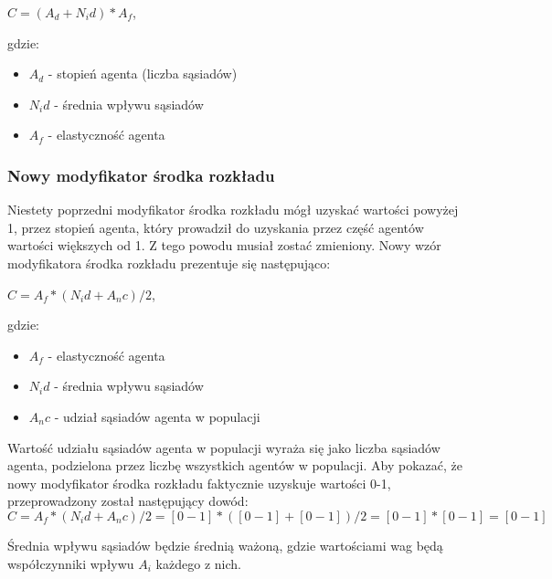 $ C = (A_d + N_id) * A_f $,

gdzie:
\begin{itemize}
    \item $A_d$ - stopień agenta (liczba sąsiadów)
    \item $N_id$ - średnia wpływu sąsiadów
    \item $A_f$ - elastyczność agenta
\end{itemize}

\subsubsection{Nowy modyfikator środka rozkładu}
Niestety poprzedni modyfikator środka rozkładu mógł uzyskać wartości powyżej 1, przez stopień agenta, który prowadził do uzyskania przez część agentów wartości większych od 1.
Z tego powodu musiał zostać zmieniony. Nowy wzór modyfikatora środka rozkładu prezentuje się następująco:

$ C = A_f * (N_id + A_nc) / 2 $,

gdzie:
\begin{itemize}
    \item $A_f$ - elastyczność agenta
    \item $N_id$ - średnia wpływu sąsiadów
    \item $A_nc$ - udział sąsiadów agenta w populacji
\end{itemize}

Wartość udziału sąsiadów agenta w populacji wyraża się jako liczba sąsiadów agenta, podzielona przez liczbę wszystkich agentów w populacji.
Aby pokazać, że nowy modyfikator środka rozkładu faktycznie uzyskuje wartości 0-1, przeprowadzony został następujący dowód:
$ C = A_f * (N_id + A_nc) / 2 = [0-1] * ([0-1] + [0-1]) / 2 = [0-1] * [0-1] = [0-1] $

Średnia wpływu sąsiadów będzie średnią ważoną, gdzie wartościami wag będą współczynniki wpływu $A_i$ każdego z nich.